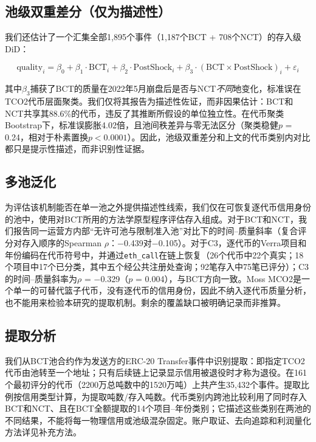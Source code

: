 \documentclass[12pt,a4paper]{article}
\begin{document}
\subsection*{池级双重差分（仅为描述性）}

我们还估计了一个汇集全部1,895个事件（1,187个BCT + 708个NCT）的存入级DiD：

$$\text{quality}_i = \beta_0 + \beta_1 \cdot \text{BCT}_i + \beta_2 \cdot \text{PostShock}_i + \beta_3 \cdot (\text{BCT} \times \text{PostShock})_i + \varepsilon_i$$

其中$\beta_3$捕获了BCT的质量在2022年5月崩盘后是否与NCT\textit{不同}地变化，标准误在TCO2代币层面聚类。我们仅将其报告为描述性佐证，而非因果估计：BCT和NCT共享其88.6\%的代币，违反了其推断所假设的单位独立性。在代币聚类Bootstrap下，标准误膨胀4.02倍，且池间秩差异与零无法区分（聚类稳健$p$ = 0.24，相对于朴素置换$p < 0.0001$）。因此，池级双重差分和上文的代币类别内对比都只是提示性描述，而非识别性证据。

\subsection*{多池泛化}

为评估该机制能否在单一池之外提供描述性线索，我们仅在可恢复逐代币信用身份的池中，使用对BCT所用的方法学原型程序评估存入组成。对于BCT和NCT，我们报告同一运营方内部“无许可池与限制准入池”对比下的时间--质量斜率（复合评分对存入顺序的Spearman $\rho$：$-$0.439对$-$0.105）。对于C3，逐代币的Verra项目和年份编码在代币符号中，并通过\texttt{eth\_call}在链上恢复（26个代币中22个真实；18个项目中17个已分类，其中五个经公共注册处查询；92笔存入中75笔已评分）；C3的时间--质量斜率为$\rho$ = $-$0.329（$p$ = 0.004），与BCT方向一致。Moss MCO2是一个单一的可替代篮子代币，没有逐代币的信用身份，因此不纳入逐代币质量分析，也不能用来检验本研究的提取机制。剩余的覆盖缺口被明确记录而非推算。

\subsection*{提取分析}

我们从BCT池合约作为发送方的ERC-20 Transfer事件中识别提取：即指定TCO2代币由池转至一个地址；只有后续链上记录显示信用被退役时才称为退役。在161个最初评分的代币（2200万总吨数中的1520万吨）上共产生35,432个事件。提取比例按信用类型计算，为提取吨数/存入吨数。代币类别内跨池比较利用了同时存入BCT和NCT、且在BCT全额提取的14个项目--年份类别；它描述这些类别在两池的不同结果，不能将每一物理信用或池级混杂固定。账户取证、去向追踪和利润量化方法详见补充方法。
\end{document}
